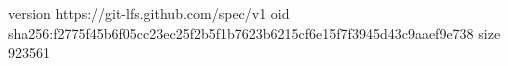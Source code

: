 version https://git-lfs.github.com/spec/v1
oid sha256:f2775f45b6f05cc23ec25f2b5f1b7623b6215cf6e15f7f3945d43c9aaef9e738
size 923561
